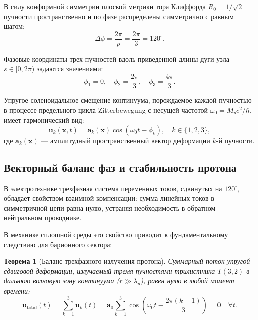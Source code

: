 \documentclass[11pt,a4paper]{article}
\newtheorem{theorem}{Теорема}
\theoremstyle{definition}
\theoremstyle{remark}
\begin{document}
В силу конформной симметрии плоской метрики тора Клиффорда $R_0 = 1/\sqrt{2}$ пучности пространственно и по фазе распределены симметрично с равным шагом:
\begin{equation}
	\Delta\phi = \frac{2\pi}{p} = \frac{2\pi}{3} = 120^\circ.
	\label{eq:three_phase_shift_step}
\end{equation}

Фазовые координаты трех пучностей вдоль приведенной длины дуги узла $s \in [0, 2\pi)$ задаются значениями:
\begin{equation}
	\phi_1 = 0, \quad \phi_2 = \frac{2\pi}{3}, \quad \phi_3 = \frac{4\pi}{3}.
	\label{eq:three_phase_coords}
\end{equation}

Упругое соленоидальное смещение континуума, порождаемое каждой пучностью в процессе предельного цикла Zitterbewegung с несущей частотой $\omega_0 = M_p c^2 / \hbar$, имеет гармонический вид:
\begin{equation}
	\mathbf{u}_k(\mathbf{x}, t) = \mathbf{a}_k(\mathbf{x}) \cos\left(\omega_0 t - \phi_k\right), \quad k \in \{1, 2, 3\},
	\label{eq:three_phase_displacements}
\end{equation}
где $\mathbf{a}_k(\mathbf{x})$ — амплитудный пространственный вектор деформации $k$-й пучности.

\subsection{Векторный баланс фаз и стабильность протона}

В электротехнике трехфазная система переменных токов, сдвинутых на $120^\circ$, обладает свойством взаимной компенсации: сумма линейных токов в симметричной цепи равна нулю, устраняя необходимость в обратном нейтральном проводнике.

В механике сплошной среды это свойство приводит к фундаментальному следствию для барионного сектора:

\begin{theorem}[Баланс трехфазного излучения протона]
	\label{thm:three_phase_cancellation}
	Суммарный поток упругой сдвиговой деформации, излучаемый тремя пучностями трилистника $T(3,2)$ в дальнюю волновую зону континуума ($r \gg \lambda_p$), равен нулю в любой момент времени:
	\begin{equation}
		\mathbf{u}_{\mathrm{total}}(t) = \sum_{k=1}^3 \mathbf{u}_k(t) = \mathbf{a}_0 \sum_{k=1}^3 \cos\left(\omega_0 t - \frac{2\pi(k-1)}{3}\right) = \mathbf{0} \quad \forall t.
		\label{eq:three_phase_sum_zero}
	\end{equation}
\end{theorem}
\end{document}
